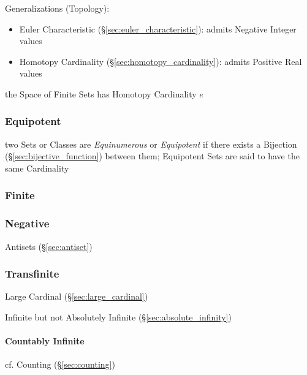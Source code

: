 \asterism


Generalizations (Topology):

\begin{itemize}
  \item Euler Characteristic (\S\ref{sec:euler_characteristic}):
    admits Negative Integer values
  \item Homotopy Cardinality (\S\ref{sec:homotopy_cardinality}):
    admits Positive Real values
\end{itemize}

the Space of Finite Sets has Homotopy Cardinality $e$



\subsubsection{Equipotent}\label{sec:equipotent}

two Sets or Classes are \emph{Equinumerous} or \emph{Equipotent} if there exists
a Bijection (\S\ref{sec:bijective_function}) between them; Equipotent Sets are
said to have the same Cardinality



\subsubsection{Finite}\label{sec:finite_cardinality}

\subsubsection{Negative}\label{sec:negative}

\fist Antisets (\S\ref{sec:antiset})



\subsubsection{Transfinite}\label{sec:transfinite}

Large Cardinal (\S\ref{sec:large_cardinal})

Infinite but not Absolutely Infinite (\S\ref{sec:absolute_infinity})



\paragraph{Countably Infinite}\label{sec:countably_infinite}\hfill

\fist cf. Counting (\S\ref{sec:counting})




